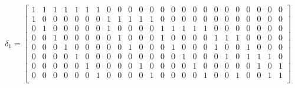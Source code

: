 \documentclass[12pt]{report}
\begin{document}
\begin{enumerate}
$$\delta_1=
\begin{bmatrix}
 1 & 1 & 1 & 1 & 1 & 1 & 1 & 0 & 0 & 0 & 0 & 0 & 0 & 0 & 0 & 0 & 0 & 0 & 0 & 0 & 0 & 0 & 0 & 0 \\ %
 1 & 0 & 0 & 0 & 0 & 0 & 0 & 1 & 1 & 1 & 1 & 1 & 0 & 0 & 0 & 0 & 0 & 0 & 0 & 0 & 0 & 0 & 0 & 0 \\ %
 0 & 1 & 0 & 0 & 0 & 0 & 0 & 1 & 0 & 0 & 0 & 0 & 1 & 1 & 1 & 1 & 1 & 0 & 0 & 0 & 0 & 0 & 0 & 0 \\ %
 0 & 0 & 1 & 0 & 0 & 0 & 0 & 0 & 1 & 0 & 0 & 0 & 1 & 0 & 0 & 0 & 0 & 1 & 1 & 1 & 0 & 0 & 0 & 0 \\ %
 0 & 0 & 0 & 1 & 0 & 0 & 0 & 0 & 0 & 1 & 0 & 0 & 0 & 1 & 0 & 0 & 0 & 1 & 0 & 0 & 1 & 0 & 0 & 0 \\ %
 0 & 0 & 0 & 0 & 1 & 0 & 0 & 0 & 0 & 0 & 0 & 0 & 0 & 0 & 1 & 0 & 0 & 0 & 1 & 0 & 1 & 1 & 1 & 0 \\ %
 0 & 0 & 0 & 0 & 0 & 1 & 0 & 0 & 0 & 0 & 1 & 0 & 0 & 0 & 0 & 1 & 0 & 0 & 0 & 0 & 0 & 1 & 0 & 1 \\ %
 0 & 0 & 0 & 0 & 0 & 0 & 1 & 0 & 0 & 0 & 0 & 1 & 0 & 0 & 0 & 0 & 1 & 0 & 0 & 1 & 0 & 0 & 1 & 1 \\ %
\end{bmatrix}$$


\end{enumerate}
\end{document}
